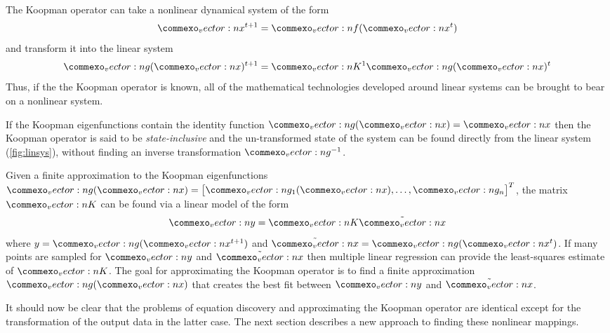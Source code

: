 \documentclass{article}
\renewcommand{\vec}[1]{\vect{#1}}
\newcommand{\mat}[1]{\vect{#1}}
\begin{document}
The Koopman operator can take a nonlinear dynamical system of the form
\begin{equation}
\vec{x}^{t+1} = \vec{f}(\vec{x}^t)
\end{equation}
and transform it into the linear system
\begin{equation}
\label{fig:linsys}
\vec{g}(\vec{x})^{t+1} = \mat{K}^1 \vec{g}(\vec{x})^{t}
\end{equation}
Thus, if the the Koopman operator is known, all of the mathematical technologies developed around linear systems can be brought to bear on a nonlinear system. 

If the Koopman eigenfunctions contain the identity function $\vec{g}(\vec{x}) = \vec{x}$ then the Koopman operator is said to be \emph{state-inclusive} and the un-transformed state of the system can be found directly from the linear system (\cref{fig:linsys}), without finding an inverse transformation $\vec{g}^{-1}$.

Given a finite approximation to the Koopman eigenfunctions $\vec{g}(\vec{x}) = \begin{bmatrix} \vec{g}_1(\vec{x}), \ldots, \vec{g}_n \end{bmatrix}^T$, the matrix $\mat{K}$ can be found via a linear model of the form 
\begin{equation}
\vec{y} = \mat{K} \tilde{\vec{x}}
\end{equation} 
where $y = \vec{g}(\vec{x}^{t+1})$ and $\tilde{\vec{x}} = \vec{g}(\vec{x}^t)$. If many points are sampled for $\vec{y}$ and $\tilde{\vec{x}}$ then multiple linear regression can provide the least-squares estimate of $\mat{K}$. The goal for approximating the Koopman operator is to find a finite approximation $\vec{g}(\vec{x})$ that creates the best fit between $\vec{y}$ and $\tilde{\vec{x}}$.

It should now be clear that the problems of equation discovery and approximating the Koopman operator are identical except for the transformation of the output data in the latter case. The next section describes a new approach to finding these nonlinear mappings.
\end{document}
